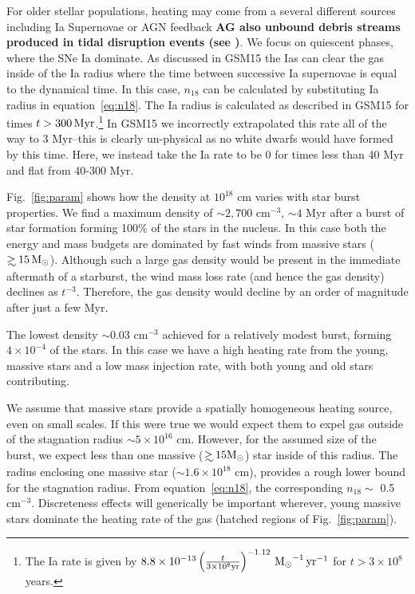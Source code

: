 \documentclass[usenatbib,fleqn]{mnras}
\newcommand\gsim{\mathrel{\rlap{\lower4pt\hbox{\hskip1pt$\sim$}}
    \raise1pt\hbox{$>$}}}
\newcommand{\Msun}{{\rm M_\odot}}
\begin{document}
For older stellar populations, heating may come from a several
different sources including Ia Supernovae or AGN feedback {\bf AG also
  unbound debris streams produced in tidal disruption events (see
  \citep{Guillochon+2015a})}. We focus on quiescent phases, where the
SNe Ia dominate. As discussed in GSM15 the Ias can clear the gas
inside of the Ia radius where the time between
successive Ia supernovae is equal to the dynamical time. In this case,
$n_{18}$ can be calculated by substituting Ia radius in
equation~\eqref{eq:n18}. The Ia radius is calculated as described in
GSM15 for times $t>300 \,{\rm Myr}$.\footnote{The Ia rate is given by $8.8
\times 10^{-13} \left(\frac{t}{3\times 10^{8} {\rm yr}}\right)^{-1.12}
\, \Msun^{-1} \, {\rm yr}^{-1} $ for $t>3\times 10^8$ years.} In GSM15
we incorrectly extrapolated this rate all of the way to 3 Myr--this is
clearly un-physical as no white dwarfs would have formed by this
time. Here, we instead take the Ia rate to be 0 for times less than 40
Myr and flat from 40-300 Myr.

Fig.~\ref{fig:param} shows how the density at $10^{18}$ cm varies with
star burst properties.  We find a maximum density of $\sim 2,700$
cm$^{-3}$, $\sim 4$ Myr after a burst of star formation forming 100\%
of the stars in the nucleus. In this case both the energy and mass
budgets are dominated by fast winds from massive stars ($\gsim 15 \,
\Msun$).  Although such a large gas density would be present in the
immediate aftermath of a starburst, the wind mass loss rate (and hence
the gas density) declines as $t^{-3}$. Therefore, the gas
density would decline by an order of magnitude after just a few Myr.

The lowest density $\sim 0.03$ cm$^{-3}$ achieved for a relatively
modest burst, forming $4\times 10^{-4}$ of the stars. In this case we
have a high heating rate from the young, massive stars and a low mass
injection rate, with both young and old stars contributing.

We assume that massive stars provide a spatially homogeneous heating
source, even on small scales. If this were true we would expect them
to expel gas outside of the stagnation radius $\sim 5\times 10^{16}$
cm. However, for the assumed size of the burst, we expect less than
one massive ($\gsim 15 \Msun$) star inside of this radius. The radius
enclosing one massive star ($\sim 1.6\times 10^{18}$ cm), provides a
rough lower bound for the stagnation radius. From
equation~\eqref{eq:n18}, the corresponding 
$n_{18} \sim$ 0.5 cm$^{-3}$. Discreteness effects will generically be
important wherever, young massive stars dominate the heating rate of
the gas (hatched regions of Fig.~\ref{fig:param}).
\end{document}
